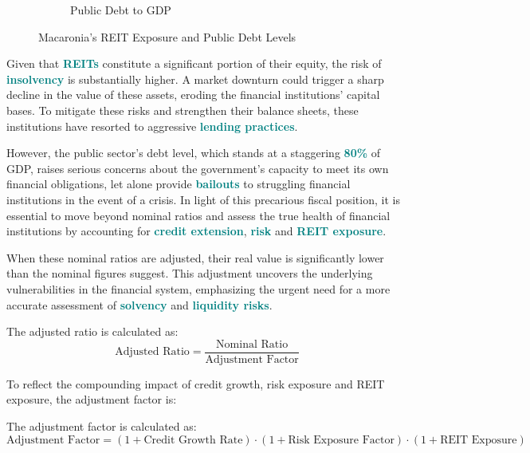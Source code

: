 \begin{figure}[h]
\begin{subfigure}{0.48\textwidth}
        \caption{\small Public Debt to GDP}
        \label{fig:public_debt_gdp}
    \end{subfigure}
    \caption{Macaronia's REIT Exposure and Public Debt Levels}  %
    \label{fig:reit_debt}
\end{figure}


Given that \textbf{\textcolor{teal}{REITs}} constitute a significant portion of their equity, the risk of \textbf{\textcolor{teal}{insolvency}} is 
substantially higher. A market downturn could trigger a sharp decline in the value of these assets,
eroding the financial institutions' capital bases. To mitigate these risks and strengthen their balance sheets, 
these institutions have resorted to aggressive \textbf{\textcolor{teal}{lending practices}}.

However, the public sector's debt level, which stands at a staggering \textbf{\textcolor{teal}{80\%}} of GDP, 
raises serious concerns about the government's capacity to meet its own financial obligations, 
let alone provide \textbf{\textcolor{teal}{bailouts}} to struggling financial institutions in the event of a crisis. 
In light of this precarious fiscal position, it is essential to move beyond nominal ratios and 
assess the true health of financial institutions by accounting for \textbf{\textcolor{teal}{credit extension}}, 
\textbf{\textcolor{teal}{risk}} and \textbf{\textcolor{teal}{REIT exposure}}.

When these nominal ratios are adjusted, their real value is significantly lower than the nominal figures suggest.
This adjustment uncovers the underlying vulnerabilities in the financial system, emphasizing the urgent need for a more 
accurate assessment of \textbf{\textcolor{teal}{solvency}} and \textbf{\textcolor{teal}{liquidity risks}}.

The adjusted ratio is calculated as:
\begin{equation}
\boxed{
    \text{Adjusted Ratio} = \frac{\text{Nominal Ratio}}{\text{Adjustment Factor}}
}
\end{equation}

To reflect the compounding impact of credit growth, risk exposure and REIT exposure, the adjustment factor is: 

The adjustment factor is calculated as:
\begin{equation}
\boxed{
    \text{Adjustment Factor} = (1 + \text{Credit Growth Rate}) \cdot (1 + \text{Risk Exposure Factor}) \cdot (1 + \text{REIT Exposure})
}
\end{equation}


